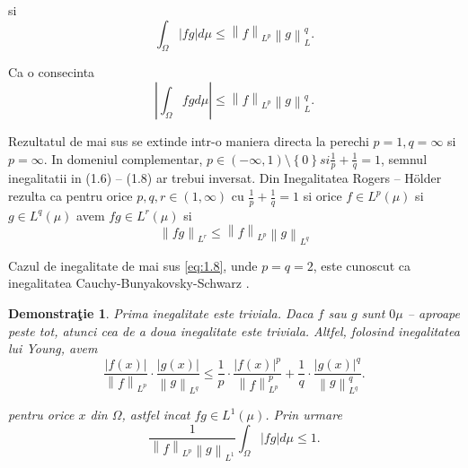 \documentclass[a4paper,12pt,oneside]{report}
\newtheorem{demonstration}{Demonstra\c tie}
\begin{document}
si 
\begin{displaymath}
  \int_{\Omega}^{}\left | fg \right |d\mu \leq \left \| f \right \|_{L^{p}}\left \| g \right \|_{L}^{q} . \label{eq:1.7} \tag{1.7}
\end{displaymath}

	Ca o consecinta 
\begin{displaymath}
  \left | \int_{\Omega}^{} fg  d\mu \right |\leq \left \| f \right \|_{L^{p}}\left \| g \right \|_{L}^{q}. \label{eq:1.8} \tag{1.8}
\end{displaymath}

	Rezultatul de mai sus se extinde intr-o maniera directa la perechi \(p = 1, q = \infty\) si \(p = \infty\). In domeniul complementar, \(p\in \left ( -\infty , 1 \right )\setminus \left \{ 0 \right \} si \frac{1}{p} + \frac{1}{q} = 1\), semnul inegalitatii in (1.6) – (1.8) ar trebui inversat. 
	Din Inegalitatea Rogers – Hölder rezulta ca pentru orice \(p, q, r \in \left ( 1 , \infty  \right )\) cu \(\frac{1}{p} + \frac{1}{q} = 1\) si orice \(f\in L^{p}\left ( \mu  \right )\) si \(g\in L^{q}\left ( \mu  \right )\) avem \(fg\in L^{r}\left ( \mu  \right )\) si 
\begin{displaymath}
  \left \| fg \right \|_{L^{r}}\leq \left \| f \right \|_{L^{p}}\left \| g \right \|_{L^{q}} \label{eq:1.9} \tag{1.9}
\end{displaymath}


Cazul de inegalitate de mai sus \ref{eq:1.8}, unde \(p = q = 2\), este cunoscut ca inegalitatea Cauchy-Bunyakovsky-Schwarz . 

\begin{demonstration}
Prima inegalitate este triviala. Daca \(f\) sau \(g\) sunt \(0 \mu\) – aproape peste tot, atunci cea de a doua inegalitate este triviala. Altfel, folosind inegalitatea lui Young, avem 
\begin{displaymath}
  \frac{\left | f\left ( x \right ) \right |}{\left \| f \right \|_{L^{p}}} \cdot \frac{\left | g\left ( x \right ) \right |}{\left \| g \right \|_{L^{q}}}\leq \frac{1}{p}\cdot \frac{\left | f\left ( x \right ) \right |^{p}}{\left \| f \right \|^{p}_{L^{p}}} + \frac{1}{q}\cdot \frac{\left | g\left ( x \right ) \right |^{q}}{\left \| g \right \|^{q}_{L^{q}}}.
\end{displaymath}
 
pentru orice \(x\) din \(\Omega\), astfel incat \(fg \in L^{1}\left ( \mu  \right )\). Prin urmare 
\begin{displaymath}
  \frac{1}{\left \| f \right \|_{L^{p}}\left \| g \right \|_{L^{1}}}\int_{\Omega }\left | fg \right |d\mu \leq 1.
\end{displaymath}
\end{demonstration}
\end{document}
